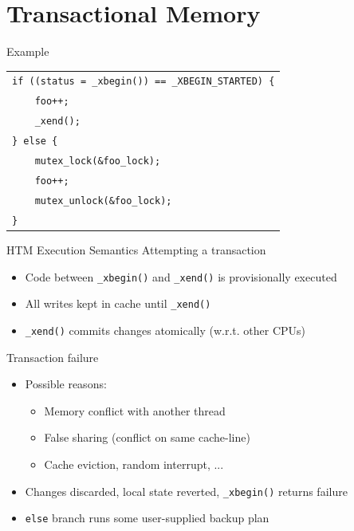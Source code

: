 \documentclass[xcolor=dvipsnames]{beamer}
\begin{document}
\section{Transactional Memory}
\newcommand\xbegin{\texttt{\_xbegin()}\xspace}
\newcommand\xend{\texttt{\_xend()}\xspace}
\newcommand\xabort{\texttt{\_xabort()}\xspace}


\begin{frame}{Example}
	\begin{center}
		\begin{tabular}{l}
			\texttt{if ((status = \_xbegin()) == \_XBEGIN\_STARTED) \{} \\
			\texttt{~~~~foo++;} \\
			\texttt{~~~~\_xend();} \\
			\texttt{\} else \{}\\ %
			\texttt{~~~~mutex\_lock(\&foo\_lock);} \\
			\texttt{~~~~foo++;} \\
			\texttt{~~~~mutex\_unlock(\&foo\_lock);} \\
			\texttt{\}} \\
		\end{tabular}
	\end{center}
\end{frame}

\begin{frame}{HTM Execution Semantics}
	Attempting a transaction
	\begin{itemize}
		\item Code between \xbegin and \xend is provisionally executed
		\item All writes kept in cache until \xend
		\item \xend commits changes atomically (w.r.t. other CPUs)
	\end{itemize}
	\pause
	\linegap

	Transaction failure
	\begin{itemize}
		\item Possible reasons:
			\begin{itemize}
				\item Memory conflict with another thread
				\item False sharing (conflict on same cache-line)
				\item Cache eviction, random interrupt, ...
			\end{itemize}
		\item Changes discarded, local state reverted, \xbegin returns failure
		\item {\tt else} branch runs some user-supplied backup plan
	\end{itemize}
\end{frame}
\end{document}
